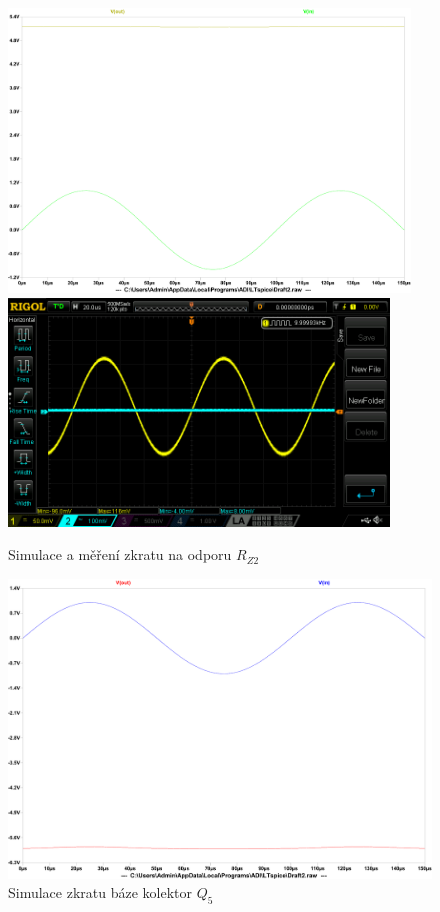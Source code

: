 \documentclass{article}
\begin{document}
\begin{figure}[H]
  \centering
  \includegraphics[width=0.95\textwidth]{sim/porucha-2/tran.pdf}
  \includegraphics[width=0.9\textwidth]{mereni/NewFile3.png}
  \caption{Simulace a měření zkratu na odporu \(R_{Z2}\)}
  \label{tran-porucha2}
\end{figure}


\begin{figure}[H]
  \centering
  \includegraphics[width=\textwidth]{sim/porucha-3/tran.pdf}
  \caption{Simulace zkratu báze kolektor \(Q_5\)}
  \label{tran-porucha3}
\end{figure}
\end{document}
